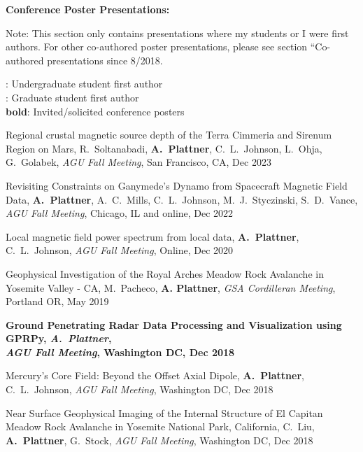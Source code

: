 \documentclass[10pt]{article}
\begin{document}
\spc
\textbf{\tsize Conference Poster Presentations:}

\vspace{0.2cm}
Note: This section only contains presentations where my students or I were first authors. For other co-authored poster presentations, please see section ``Co-authored presentations since 8/2018.


\spcp
\ug: Undergraduate student first author\\
\gr: Graduate student first author\\
\textbf{bold}: Invited/solicited conference posters

\spcp
\hspace*{-0.35cm} \gr \hspace*{0.02cm} Regional crustal magnetic source depth of the Terra Cimmeria and Sirenum Region on Mars, R.~Soltanabadi, \textbf{A.~Plattner}, C.~L.~Johnson, L.~Ohja, G.~Golabek, \emph{AGU Fall Meeting}, San Francisco, CA, Dec 2023 

\spcp
Revisiting Constraints on Ganymede's Dynamo from Spacecraft Magnetic Field Data,
\textbf{A.~Plattner}, A.~C.~Mills, C.~L.~Johnson, M.~J.~Styczinski, S.~D.~Vance,  \emph{AGU Fall Meeting}, Chicago, IL and online, Dec 2022 

\spcp
Local magnetic field power spectrum from local data,
\textbf{A.~Plattner}, C.~L.~Johnson, 
\emph{AGU Fall Meeting}, Online, Dec 2020 

\spcp
\hspace*{-0.35cm} \gr \hspace*{0.05cm} Geophysical Investigation of the Royal Arches Meadow Rock
Avalanche in Yosemite Valley - CA,
M.~Pacheco, \textbf{A. Plattner},
\emph{GSA Cordilleran Meeting}, Portland OR, May 2019

\spcp
\textbf{Ground Penetrating Radar Data Processing and Visualization using
GPRPy,
\emph{A.~Plattner},\\
\emph{AGU Fall Meeting}, Washington DC, Dec 2018}

\spcp
Mercury's Core Field: Beyond the Offset Axial Dipole,
\textbf{A.~Plattner}, C.~L.~Johnson, 
\emph{AGU Fall Meeting}, Washington DC, Dec 2018 

\spcp
\hspace*{-0.4cm} \gr \hspace*{-0.05cm} Near Surface Geophysical Imaging of the Internal
Structure of El Capitan Meadow Rock Avalanche in Yosemite National
Park, California,
C.~Liu, \textbf{A.~Plattner}, G.~Stock,
\emph{AGU Fall Meeting}, Washington DC, Dec 2018
\end{document}
